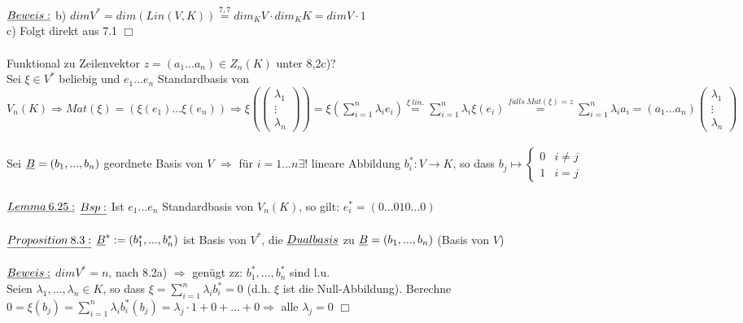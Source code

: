 \documentclass[fleqn, a4paper, 11pt]{article}
\begin{document}
\\
$\uline{Beweis:}$ b) $dim V^{\ast}=dim(Lin(V,K))\stackrel{7,7}{=}dim_K V\cdot dim_K K=dim V\cdot 1$\\
c) Folgt direkt aus 7.1 \hfill $\Box$\\
\\
Funktional zu Zeilenvektor $z=(a_1...a_n)\in Z_n(K)$ unter 8,2c)?\\
Sei $\xi \in V^{\ast}$ beliebig und $e_1...e_n$ Standardbasis von $V_n(K)\Rightarrow Mat(\xi)=(\xi(e_1)\dots \xi(e_n))\Rightarrow \xi(\begin{pmatrix}
	\lambda_1\\
	\vdots\\
	\lambda_n
\end{pmatrix})=\xi(\sum\limits_{i=1}^n \lambda_i e_i)\stackrel{\xi\:lin.}{=}\sum\limits_{i=1}^n \lambda_i \xi(e_i)\stackrel{falls\:Mat(\xi)=z}{=}\sum\limits_{i=1}^n \lambda_i a_i=(a_1...a_n)\begin{pmatrix}
	\lambda_1\\
	\vdots\\
	\lambda_n
\end{pmatrix}$\\
\\
Sei $\uline{B}=(b_1,...,b_n)$ geordnete Basis von $V$ $\Rightarrow$ f\"ur $i=1...n\exists!$ lineare Abbildung $b_i^{\ast}:V\rightarrow K$, so dass $b_j\mapsto \begin{cases}
	0 & i\neq j\\
	1 & i=j
\end{cases}$\\
\\
$\uline{Lemma\:6.25:}$ $\uline{Bsp:}$ Ist $e_1...e_n$ Standardbasis von $V_n(K)$, so gilt: $e_i^{\ast}=(0\dots 010\dots 0)$\\
\\
$\uline{Proposition\:8.3:}$ $\uline{B}^{\ast}:=(b_1^{\ast},...,b_n^{\ast})$ ist Basis von $V^{\ast}$, die $\uline{Dualbasis}$ zu $\uline{B}=(b_1,...,b_n)$ (Basis von $V$)\\
\\
$\uline{Beweis:}$ $dim V^{\ast}=n$, nach 8.2a) $\Rightarrow$ gen\"ugt zz: $b_1^{\ast},...,b_n^{\ast}$ sind l.u.\\
Seien $\lambda_1,...,\lambda_n\in K$, so dass $\xi=\sum\limits_{i=1}^n \lambda_i b_i^{\ast}=0$ (d.h. $\xi$ ist die Null-Abbildung). Berechne $0=\xi(b_j)=\sum\limits_{i=1}^n \lambda_i b_i^{\ast}(b_j)=\lambda_j\cdot 1+0+...+0\Rightarrow $ alle $\lambda_j=0$ \hfill $\Box$\\
\end{document}

